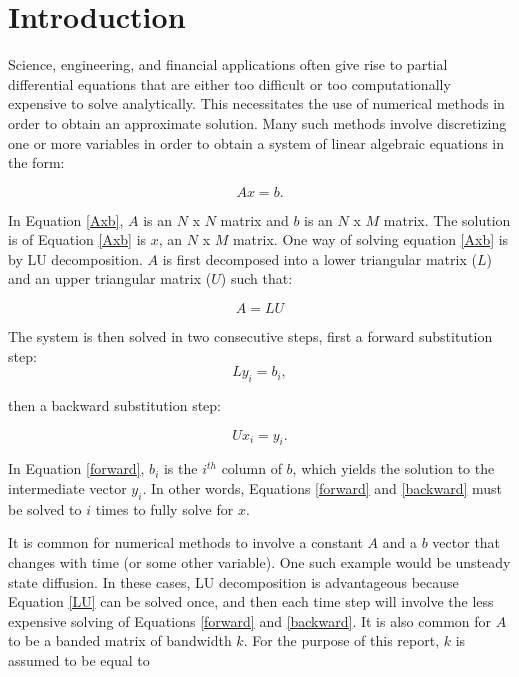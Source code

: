 \documentclass[12pt]{article}
\begin{document}
\newpage 
\tableofcontents
\newpage
\section{Introduction}
\label{sec:introduction}

Science, engineering, and financial applications often give rise to partial
differential equations that are either too difficult or too computationally
expensive to solve analytically. This necessitates the use of numerical
methods in order to obtain an approximate solution. Many such methods involve
discretizing one or more variables in order to obtain a system of linear algebraic
equations in the form:

\begin{equation}
\label{Axb}
Ax=b.
\end{equation}

In Equation \ref{Axb}, $A$ is an $N$ x $N$ matrix and $b$ is  an $N$ x $M$
matrix. The solution is of Equation \ref{Axb} is $x$, an $N$ x $M$ matrix. One
way of solving equation \ref{Axb} is by LU decomposition. $A$ is first
decomposed into a lower triangular matrix ($L$) and an upper triangular matrix
($U$) such that:
 
\begin{equation}
\label{LU}
A = LU
\end{equation}  

The system is then solved in two consecutive steps, first a forward substitution step:
\begin{equation}
\label{forward}
Ly_i = b_i,
\end{equation}

then a backward substitution step:

\begin{equation}
\label{backward}
Ux_i = y_i.
\end{equation}

In Equation \ref{forward}, $b_i$ is the $i^{th}$ column of $b$, which yields
the solution to the intermediate vector $y_i$. In other words, Equations
\ref{forward} and \ref{backward} must be solved to $i$ times to fully solve for
$x$. 

It is common for numerical methods to involve a constant $A$ and a
$b$ vector that changes with time (or some other variable). One such example
would be unsteady state diffusion. In these cases, LU decomposition is
advantageous because Equation \ref{LU} can be solved once, and then each
time step will involve the less expensive solving of Equations \ref{forward} and
\ref{backward}. It is also common for $A$ to be a banded matrix of bandwidth $k$. For the
purpose of this report, $k$ is assumed to be equal to
\end{document}
